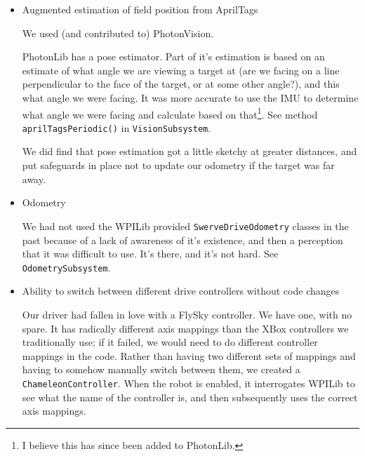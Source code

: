 \documentclass[]{article}
\newcommand{\zztt}[1]{{\texttt{\footnotesize{#1}}}}
\begin{document}
\begin{itemize}[topsep=0pt]
	
\item Augmented estimation of field position from AprilTags

We used (and contributed to) PhotonVision.

PhotonLib has a pose estimator.
Part of it's estimation is based on an estimate of what angle we are viewing a target at (are we facing on a line perpendicular to the face of the target, or at some other angle?), and this what angle we were facing.
It was more accurate to use the IMU to determine what angle we were facing and calculate based on that\footnote{I believe this has since been added to PhotonLib.}. See method \zztt{aprilTagsPeriodic()} in \zztt{VisionSubsystem}.

We did find that pose estimation got a little sketchy at greater distances, and put safeguards in place not to update our odometry if the target was far away.

\item Odometry

We had not used the WPILib provided \zztt{SwerveDriveOdometry} classes in the past because of a lack of awareness of it's existence, and then a perception that it was difficult to use. It's there, and it's not hard. See \zztt{OdometrySubsystem}.

\item Ability to switch between different drive controllers without code changes

Our driver had fallen in love with a FlySky controller. We have one, with no spare. It has radically different axis mappings than the XBox controllers we traditionally use; if it failed, we would need to do different controller mappings in the code. Rather than having two different sets of mappings and having to somehow manually switch between them, we created a \zztt{ChameleonController}. When the robot is enabled, it interrogates WPILib to see what the name of the controller is, and then subsequently uses the correct axis mappings.

\end{itemize}
\end{document}
